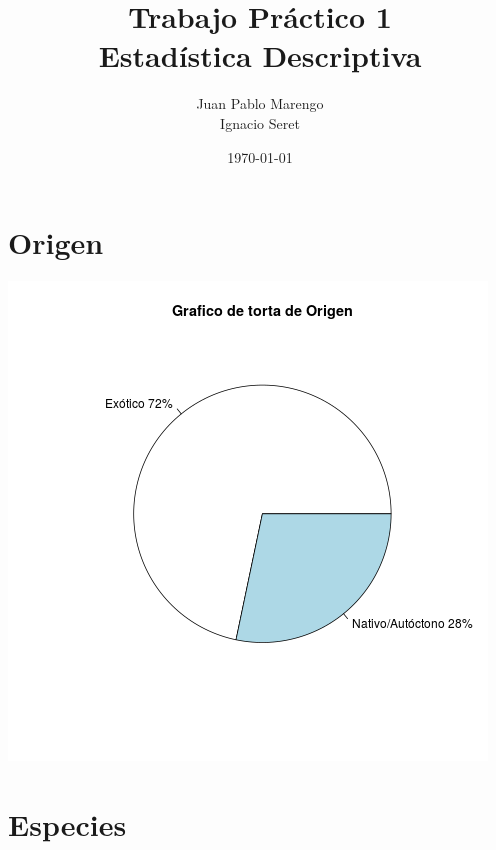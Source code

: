 \documentclass{article}
\title{Trabajo Práctico 1 \\ Estadística Descriptiva}
\author{Juan Pablo Marengo \\ Ignacio Seret}
\date{\today}
\begin{document}
\maketitle

\thispagestyle{empty}

\newpage

\tableofcontents

\newpage

\section{Origen}

\includegraphics[width=\textwidth]{origen_piechart.png}

\section{Especies}
\end{document}
